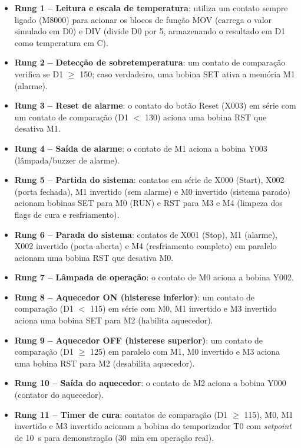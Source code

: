 \documentclass[
  12pt,
  openright,
  oneside,
  a4paper,
  chapter=TITLE,
  section=TITLE,
  brazilian
]{abntex2}
\begin{document}
\begin{itemize}
    \item \textbf{Rung 1 -- Leitura e escala de temperatura}: utiliza um contato sempre ligado (M8000) para acionar os blocos de fun\c{c}\~{a}o MOV (carrega o valor simulado em D0) e DIV (divide D0 por 5, armazenando o resultado em D1 como temperatura em \textdegree{}C).
    \item \textbf{Rung 2 -- Detec\c{c}\~{a}o de sobretemperatura}: um contato de compara\c{c}\~{a}o verifica se D1 $\geq$ 150; caso verdadeiro, uma bobina SET ativa a mem\'{o}ria M1 (alarme).
    \item \textbf{Rung 3 -- Reset de alarme}: o contato do bot\~{a}o Reset (X003) em s\'{e}rie com um contato de compara\c{c}\~{a}o (D1 $<$ 130) aciona uma bobina RST que desativa M1.
    \item \textbf{Rung 4 -- Sa\'{i}da de alarme}: o contato de M1 aciona a bobina Y003 (l\^{a}mpada/buzzer de alarme).
    \item \textbf{Rung 5 -- Partida do sistema}: contatos em s\'{e}rie de X000 (Start), X002 (porta fechada), M1 invertido (sem alarme) e M0 invertido (sistema parado) acionam bobinas SET para M0 (RUN) e RST para M3 e M4 (limpeza dos flags de cura e resfriamento).
    \item \textbf{Rung 6 -- Parada do sistema}: contatos de X001 (Stop), M1 (alarme), X002 invertido (porta aberta) e M4 (resfriamento completo) em paralelo acionam uma bobina RST que desativa M0.
    \item \textbf{Rung 7 -- L\^{a}mpada de opera\c{c}\~{a}o}: o contato de M0 aciona a bobina Y002.
    \item \textbf{Rung 8 -- Aquecedor ON (histerese inferior)}: um contato de compara\c{c}\~{a}o (D1 $<$ 115) em s\'{e}rie com M0, M1 invertido e M3 invertido aciona uma bobina SET para M2 (habilita aquecedor).
    \item \textbf{Rung 9 -- Aquecedor OFF (histerese superior)}: um contato de compara\c{c}\~{a}o (D1 $\geq$ 125) em paralelo com M1, M0 invertido e M3 aciona uma bobina RST para M2 (desabilita aquecedor).
    \item \textbf{Rung 10 -- Sa\'{i}da do aquecedor}: o contato de M2 aciona a bobina Y000 (contator do aquecedor).
    \item \textbf{Rung 11 -- Timer de cura}: contatos de compara\c{c}\~{a}o (D1 $\geq$ 115), M0, M1 invertido e M3 invertido acionam a bobina do temporizador T0 com \textit{setpoint} de 10~s para demonstra\c{c}\~{a}o (30~min em opera\c{c}\~{a}o real).

\end{itemize}
\end{document}
